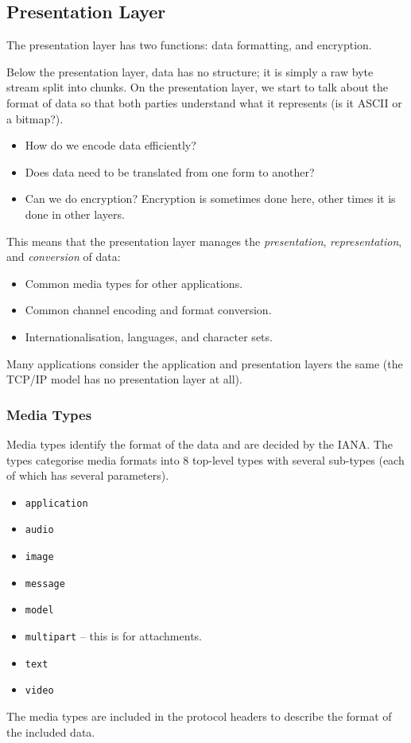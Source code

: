 \subsection{Presentation Layer}\label{sub:presentation_layer}

The presentation layer has two functions: data formatting, and encryption.

Below the presentation layer, data has no structure; it is simply a raw byte stream split into chunks.
On the presentation layer, we start to talk about the format of data so that both parties understand what it represents (is it ASCII or a bitmap?).
\begin{itemize}
    \item How do we encode data efficiently?
    \item Does data need to be translated from one form to another?
    \item Can we do encryption?
          Encryption is sometimes done here, other times it is done in other layers.
\end{itemize}
This means that the presentation layer manages the \emph{presentation}, \emph{representation}, and \emph{conversion} of data:
\begin{itemize}
    \item Common media types for other applications.
    \item Common channel encoding and format conversion.
    \item Internationalisation, languages, and character sets.
\end{itemize}
Many applications consider the application and presentation layers the same (the TCP/IP model has no presentation layer at all).

\subsubsection{Media Types}\label{ssub:media_types}

Media types identify the format of the data and are decided by the IANA.
The types categorise media formats into \(8\) top-level types with several sub-types (each of which has several parameters).
\begin{itemize}
    \item \texttt{application}
    \item \texttt{audio}
    \item \texttt{image}
    \item \texttt{message}
    \item \texttt{model}
    \item \texttt{multipart} -- this is for attachments.
    \item \texttt{text}
    \item \texttt{video}
\end{itemize}
\begin{note}
    The media types are included in the protocol headers to describe the format of the included data.
\end{note}

